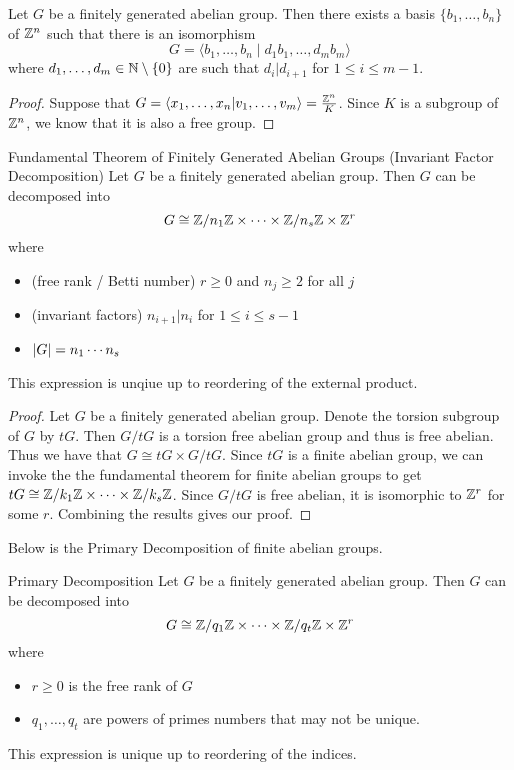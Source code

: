 \documentclass[a4paper]{article}
\begin{document}
\begin{prp}{}{} Let $G$ be a finitely generated abelian group. Then there exists a basis $\{b_1,\dots,b_n\}$ of $\mathbb{Z}^n$ such that there is an isomorphism $$G=\langle b_1,\dots,b_n\;|\;d_1b_1,\dots,d_mb_m\rangle$$ where $d_1,\dots,d_m\in\mathbb{N}\setminus\{0\}$ are such that $d_i|d_{i+1}$ for $1\leq i\leq m-1$. \tcbline
\begin{proof}
Suppose that $G=\langle x_1,\dots,x_n|v_1,\dots,v_m\rangle=\frac{\mathbb{Z}^n}{K}$. Since $K$ is a subgroup of $\mathbb{Z}^n$, we know that it is also a free group. 
\end{proof}
\end{prp}

\begin{thm}{Fundamental Theorem of Finitely Generated Abelian Groups (Invariant Factor Decomposition)}{} Let $G$ be a finitely generated abelian group. Then $G$ can be decomposed into $$G\cong \mathbb{Z}/n_1\mathbb{Z}\times\cdots\times\mathbb{Z}/n_s\mathbb{Z}\times\mathbb{Z}^r$$ where 
\begin{itemize}
\item (free rank / Betti number) $r\geq 0$ and $n_j\geq 2$ for all $j$
\item (invariant factors) $n_{i+1}|n_i$ for $1\leq i\leq s-1$
\item $\abs{G}=n_1\cdots n_s$
\end{itemize}
This expression is unqiue up to reordering of the external product. \tcbline
\begin{proof}
Let $G$ be a finitely generated abelian group. Denote the torsion subgroup of $G$ by $tG$. Then $G/tG$ is a torsion free abelian group and thus is free abelian. Thus we have that $G\cong tG\times G/tG$. Since $tG$ is a finite abelian group, we can invoke the the fundamental theorem for finite abelian groups to get $tG\cong\mathbb{Z}/k_1\mathbb{Z}\times\cdots\times\mathbb{Z}/k_s\mathbb{Z}$. Since $G/tG$ is free abelian, it is isomorphic to $\mathbb{Z}^r$ for some $r$. Combining the results gives our proof. 
\end{proof}
\end{thm}

Below is the Primary Decomposition of finite abelian groups. 

\begin{thm}{Primary Decomposition}{} Let $G$ be a finitely generated abelian group. Then $G$ can be decomposed into $$G\cong\mathbb{Z}/q_1\mathbb{Z}\times\cdots\times\mathbb{Z}/q_t\mathbb{Z}\times\mathbb{Z}^r$$ where 
\begin{itemize}
\item $r\geq 0$ is the free rank of $G$
\item $q_1,\dots,q_t$ are powers of primes numbers that may not be unique. 
\end{itemize}
This expression is unique up to reordering of the indices. 
\end{thm}
\end{document}
